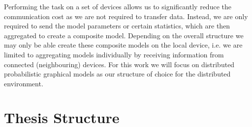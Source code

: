 Performing the task on a set of devices allows us to significantly reduce the communication cost as we are not required to transfer data.
Instead, we are only required to send the model parameters or certain statistics, which are then aggregated to create a composite model.
Depending on the overall structure we may only be able create these composite models on the local device, i.e. we are limited to aggregating models individually by receiving information from connected (neighbouring) devices.
For this work we will focus on distributed probabilistic graphical models as our structure of choice for the distributed environment.
\section{Thesis Structure}